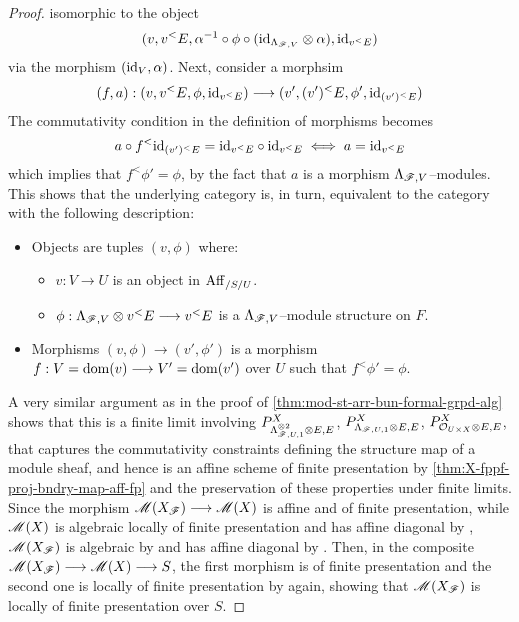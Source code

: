 \documentclass[11pt]{amsart}
\begin{document}
\begin{proof}
isomorphic to the object
\[
(v, v^<E, \alpha^{-1} \circ \phi \circ (\mathrm{id}_{\Lambda_{\mathscr{F}, V}} \otimes \alpha),
  \mathrm{id}_{v^<E})
\]
via the morphism $(\mathrm{id}_V, \alpha)$. Next, consider a morphsim
\[
(f, a) : (v, v^<E, \phi, \id_{v^<E}) \to (v', (v')^<E, \phi', \id_{(v')^<E})
\]
The commutativity condition in the definition of morphisms becomes
\[
a \circ f^<\mathrm{id}_{(v')^<E} = \mathrm{id}_{v^<E} \circ \mathrm{id}_{v^<E}
\iff a = \mathrm{id}_{v^<E}
\]
which implies that $f^<\phi' = \phi$, by the fact that $a$ is a morphism
$\Lambda_{\mathscr{F}, V}$--modules. This shows that the underlying category is, in
turn, equivalent to the category with the following description:
\begin{itemize}
\item Objects are tuples $(v, \phi)$ where:
  \begin{itemize}
  \item $v : V \to U$ is an object in $\mathrm{Aff}_{/S/U}$.
  \item $\phi : \Lambda_{\sF, V} \otimes v^<E \to v^<E$ is a
    $\Lambda_{\mathscr{F}, V}$--module structure on $F$.
  \end{itemize}
\item Morphisms $(v, \phi) \to (v', \phi')$ is a morphism
  $f : V = \dom(v) \to V' = \dom(v')$ over $U$ such that $f^<\phi' = \phi$.
\end{itemize}

A very similar argument as in the proof of
\cref{thm:mod-st-arr-bun-formal-grpd-alg} shows that this is a finite limit
involving $P^X_{\Lambda_{\mathscr{F}, U, 1}^{\otimes 2} \otimes E, E}$,
$P^X_{\Lambda_{\mathscr{F}, U, 1} \otimes E, E}$,
$P^X_{\mathcal{O}_{U \times X} \otimes E, E}$, that captures the commutativity
constraints defining the structure map of a module sheaf, and hence is an
affine scheme of finite presentation by \cref{thm:X-fppf-proj-bndry-map-aff-fp}
and the preservation of these properties under finite limits.
Since the morphism $\sM(X_\sF) \to \sM(X)$ is affine and of finite presentation,
while $\mathscr{M}(X)$ is algebraic locally of finite presentation and has affine
diagonal by \cite[Theorem 1.0.1]{Wang-BunG}, $\mathscr{M}(X_\mathscr{F})$
is algebraic by
\cite[\href{https://stacks.math.columbia.edu/tag/05UM}{Lemma 05UM}]
{stacks-project} and has affine diagonal by \cite[Lemma 4.9]{ModQuivBun}.
Then, in the composite $\sM(X_\sF) \to \sM(X) \to S$, the first morphism is of
finite presentation and the second one is locally of finite presentation by
\cite[Theorem 1.0.1]{Wang-BunG} again, showing that $\mathscr{M}(X_\mathscr{F})$ is locally
of finite presentation over $S$.
\end{proof}
\end{document}
